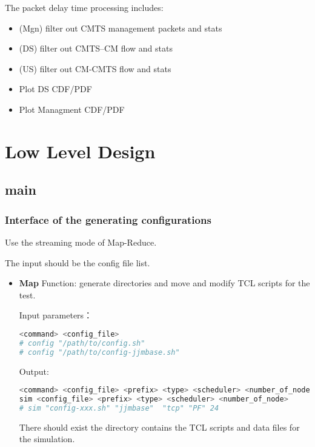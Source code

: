 The packet delay time processing includes:
\begin{itemize}
  \item (Mgn) filter out CMTS management packets and stats
  \item (DS) filter out CMTS--CM flow and stats
  \item (US) filter out CM-CMTS flow and stats
  \item Plot DS CDF/PDF
  \item Plot Managment CDF/PDF
\end{itemize}


\section{Low Level Design}

\subsection{main}


\subsubsection{Interface of the generating configurations}

Use the streaming mode of Map-Reduce.

The input should be the config file list.

\begin{itemize}
  \item \textbf{Map}
Function: generate directories and move and modify TCL scripts for the test.


Input parameters：
\begin{lstlisting}[language=bash]
<command> <config_file>
# config "/path/to/config.sh"
# config "/path/to/config-jjmbase.sh"
\end{lstlisting}


Output:
\begin{lstlisting}[language=bash]
<command> <config_file> <prefix> <type> <scheduler> <number_of_node>
sim <config_file> <prefix> <type> <scheduler> <number_of_node>
# sim "config-xxx.sh" "jjmbase"  "tcp" "PF" 24
\end{lstlisting}

There should exist the directory contains the TCL scripts and data files for the simulation.

\end{itemize}



